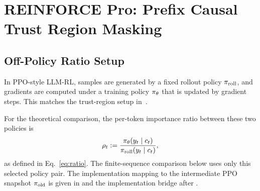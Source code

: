 \section{REINFORCE Pro: Prefix Causal Trust Region Masking}
\label{sec:reinforce-pro}

\subsection{Off-Policy Ratio Setup}
\label{sec:offpolicy-problem}

In PPO-style LLM-RL, samples are generated by a fixed rollout policy $\pi_{\mathrm{roll}}$, and gradients are computed under a training policy
$\pi_{\theta}$ that is updated by gradient steps. This matches the trust-region setup in~\citet{li2025trm}.

For the theoretical comparison, the per-token importance ratio between these
two policies is
\begin{equation*}
    \rho_t := \frac{\pi_{\theta}(y_t \mid c_t)}{\pi_{\mathrm{roll}}(y_t \mid c_t)},
\end{equation*}
as defined in Eq.~\eqref{eq:ratio}. The finite-sequence comparison below
uses only this selected policy pair. The implementation mapping to the
intermediate PPO snapshot $\pi_{\mathrm{old}}$ is given in
 and the implementation bridge after
.

